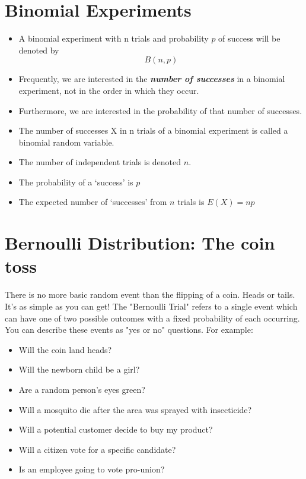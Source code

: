 \section*{Binomial Experiments}
\begin{itemize}
\item A binomial experiment with n trials and
probability $p$ of success will be denoted by
\[B(n, p)\]
\item Frequently, we are interested in the \textbf{\emph{number of successes}} in a binomial experiment, not in the order in which they occur.
\item Furthermore, we are interested in the probability of that number of successes.

\item The number of successes X in n trials of a binomial experiment is called a binomial random variable.
\item The number of independent trials is denoted $n$.
\item The probability of a `success' is $p$
\item The expected number of `successes' from $n$ trials is $E(X) = np$
\end{itemize}


\section*{Bernoulli Distribution: The coin toss}

There is no more basic random event than the flipping of a coin. Heads or tails. It's as simple as you can get! The "Bernoulli Trial" refers to a single event which can have one of two possible outcomes with a fixed probability of each occurring. You can describe these events as "yes or no" questions. For example:

\begin{itemize}
	\item Will the coin land heads?
	\item Will the newborn child be a girl?
	\item Are a random person's eyes green?
	\item Will a mosquito die after the area was sprayed with insecticide?
	\item Will a potential customer decide to buy my product?
	\item Will a citizen vote for a specific candidate?
	\item Is an employee going to vote pro-union?
\end{itemize}

